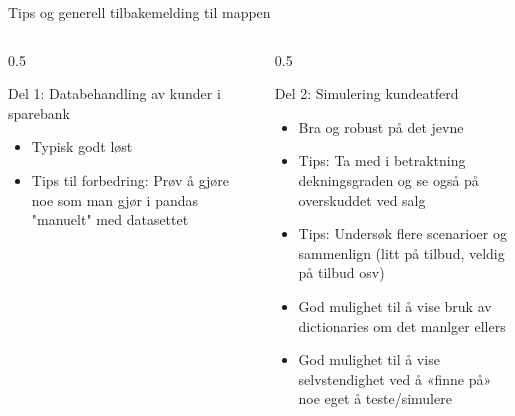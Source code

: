 \documentclass[aspectratio=169]{beamer}
\begin{document}
\begin{frame}{Tips og generell tilbakemelding til mappen}
   \footnotesize
   \begin{columns}
      \begin{column}{0.5\textwidth}
         \begin{block}{Del 1: Databehandling av kunder i sparebank}
            \begin{itemize}
               \item {Typisk godt løst}
               \item {Tips til forbedring: Prøv å gjøre noe som man gjør i pandas "manuelt" med datasettet}
            \end{itemize}
         \end{block}
      \end{column}
      \begin{column}{0.5\textwidth}
         \begin{block}{Del 2: Simulering kundeatferd}
            \begin{itemize}
               \item {Bra og robust på det jevne}
               \item {Tips: Ta med i betraktning dekningsgraden og se også på overskuddet ved salg}
               \item {Tips: Undersøk flere scenarioer og sammenlign (litt på tilbud, veldig på tilbud osv)}
               \item {God mulighet til å vise bruk av dictionaries om det manlger ellers}
               \item {God mulighet til å vise selvstendighet ved å «finne på» noe eget å teste/simulere}
            \end{itemize}
         \end{block}
      \end{column}
   \end{columns}
\end{frame}
\end{document}
